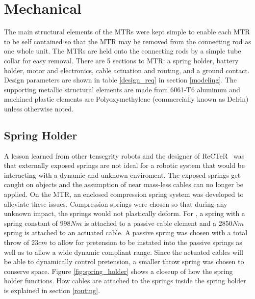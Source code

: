\section{Mechanical}
The main structural elements of the MTRs were kept simple to  enable  each  MTR  to  be self  contained  so  that  the  MTR  may be removed from the connecting rod as one whole unit.
The MTRs  are  held  onto  the  connecting  rods  by  a  simple tube  collar  for  easy  removal. 
There  are  5  sections  to MTR: a spring holder, battery holder, motor and electronics, cable actuation and routing, and a ground contact. 
Design parameters are shown in table \ref{design_req} in section \ref{modeling}.
The supporting metallic structural elements are made from 6061-T6 aluminum and machined plastic elements are Polyoxymethylene (commercially known as Delrin) unless otherwise noted.

\subsection{Spring Holder}
A  lesson  learned  from other tensegrity robots and the designer of ReCTeR~\cite{Caluwaerts2013rsif} was  that  externally  exposed springs are not ideal for a robotic system that would be interacting with a dynamic and unknown enviroment. 
The exposed springs get caught on objects and the assumption of near mass-less cables  can  no  longer  be  applied.  
On  the  MTR, an enclosed compression spring system was developed  to  alleviate  these  issues.  
Compression  springs were chosen so that during any unknown impact, the springs would not plastically deform. 
For \SB{}, a spring with a spring constant of \(998 Nm\) is attached to a passive cable element  and  a \(2850 Nm\) spring  is  attached  to  an  actuated cable.  
A  passive  spring was chosen with a total throw of \(23 cm\) to allow for pretension to be instated into the passive springs as well as to allow a wide dynamic compliant range.  
Since the actuated cables will be able to dynamically control pretension, a smaller throw spring was chosen to conserve space.
Figure \ref{fig:spring_holder} shows a closeup of how the spring holder functions.
How cables are attached to the springs inside the spring holder is explained in section \ref{routing}.


